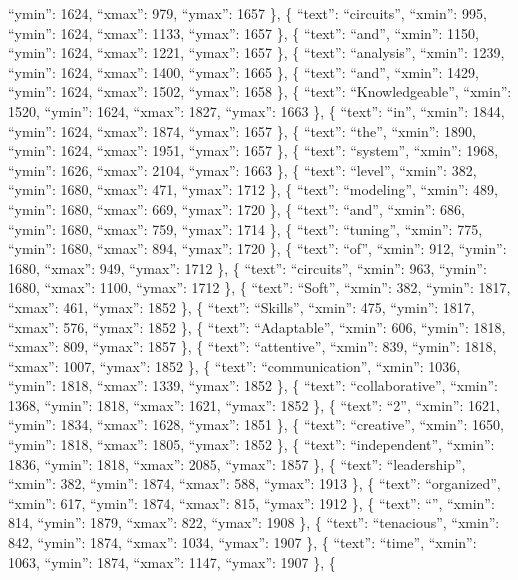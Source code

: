 \documentclass[
]{article}
\begin{document}
``ymin'': 1624, ``xmax'': 979, ``ymax'': 1657 \}, \{ ``text'':
``circuits'', ``xmin'': 995, ``ymin'': 1624, ``xmax'': 1133, ``ymax'':
1657 \}, \{ ``text'': ``and'', ``xmin'': 1150, ``ymin'': 1624, ``xmax'':
1221, ``ymax'': 1657 \}, \{ ``text'': ``analysis'', ``xmin'': 1239,
``ymin'': 1624, ``xmax'': 1400, ``ymax'': 1665 \}, \{ ``text'': ``and'',
``xmin'': 1429, ``ymin'': 1624, ``xmax'': 1502, ``ymax'': 1658 \}, \{
``text'': ``Knowledgeable'', ``xmin'': 1520, ``ymin'': 1624, ``xmax'':
1827, ``ymax'': 1663 \}, \{ ``text'': ``in'', ``xmin'': 1844, ``ymin'':
1624, ``xmax'': 1874, ``ymax'': 1657 \}, \{ ``text'': ``the'', ``xmin'':
1890, ``ymin'': 1624, ``xmax'': 1951, ``ymax'': 1657 \}, \{ ``text'':
``system'', ``xmin'': 1968, ``ymin'': 1626, ``xmax'': 2104, ``ymax'':
1663 \}, \{ ``text'': ``level'', ``xmin'': 382, ``ymin'': 1680,
``xmax'': 471, ``ymax'': 1712 \}, \{ ``text'': ``modeling'', ``xmin'':
489, ``ymin'': 1680, ``xmax'': 669, ``ymax'': 1720 \}, \{ ``text'':
``and'', ``xmin'': 686, ``ymin'': 1680, ``xmax'': 759, ``ymax'': 1714
\}, \{ ``text'': ``tuning'', ``xmin'': 775, ``ymin'': 1680, ``xmax'':
894, ``ymax'': 1720 \}, \{ ``text'': ``of'', ``xmin'': 912, ``ymin'':
1680, ``xmax'': 949, ``ymax'': 1712 \}, \{ ``text'': ``circuits'',
``xmin'': 963, ``ymin'': 1680, ``xmax'': 1100, ``ymax'': 1712 \}, \{
``text'': ``Soft'', ``xmin'': 382, ``ymin'': 1817, ``xmax'': 461,
``ymax'': 1852 \}, \{ ``text'': ``Skills'', ``xmin'': 475, ``ymin'':
1817, ``xmax'': 576, ``ymax'': 1852 \}, \{ ``text'': ``Adaptable'',
``xmin'': 606, ``ymin'': 1818, ``xmax'': 809, ``ymax'': 1857 \}, \{
``text'': ``attentive'', ``xmin'': 839, ``ymin'': 1818, ``xmax'': 1007,
``ymax'': 1852 \}, \{ ``text'': ``communication'', ``xmin'': 1036,
``ymin'': 1818, ``xmax'': 1339, ``ymax'': 1852 \}, \{ ``text'':
``collaborative'', ``xmin'': 1368, ``ymin'': 1818, ``xmax'': 1621,
``ymax'': 1852 \}, \{ ``text'': ``2'', ``xmin'': 1621, ``ymin'': 1834,
``xmax'': 1628, ``ymax'': 1851 \}, \{ ``text'': ``creative'', ``xmin'':
1650, ``ymin'': 1818, ``xmax'': 1805, ``ymax'': 1852 \}, \{ ``text'':
``independent'', ``xmin'': 1836, ``ymin'': 1818, ``xmax'': 2085,
``ymax'': 1857 \}, \{ ``text'': ``leadership'', ``xmin'': 382, ``ymin'':
1874, ``xmax'': 588, ``ymax'': 1913 \}, \{ ``text'': ``organized'',
``xmin'': 617, ``ymin'': 1874, ``xmax'': 815, ``ymax'': 1912 \}, \{
``text'': ``\textbar{}'', ``xmin'': 814, ``ymin'': 1879, ``xmax'': 822,
``ymax'': 1908 \}, \{ ``text'': ``tenacious'', ``xmin'': 842, ``ymin'':
1874, ``xmax'': 1034, ``ymax'': 1907 \}, \{ ``text'': ``time'',
``xmin'': 1063, ``ymin'': 1874, ``xmax'': 1147, ``ymax'': 1907 \}, \{
\end{document}
